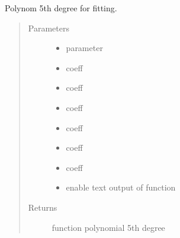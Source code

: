 \documentclass[letterpaper,10pt,english]{sphinxmanual}
\begin{document}

\begin{fulllineitems}
\label{\detokenize{fit-functions:fit_functions.poly5}}
Polynom 5th degree for fitting.
\begin{quote}\begin{description}
\item[{Parameters}] \leavevmode\begin{itemize}
\item {} 
 \textendash{} parameter

\item {} 
 \textendash{} coeff

\item {} 
 \textendash{} coeff

\item {} 
 \textendash{} coeff

\item {} 
 \textendash{} coeff

\item {} 
 \textendash{} coeff

\item {} 
 \textendash{} coeff

\item {} 
 \textendash{} enable text output of function

\end{itemize}

\item[{Returns}] \leavevmode
function \textendash{} polynomial 5th degree

\end{description}\end{quote}

\end{fulllineitems}

\end{document}
